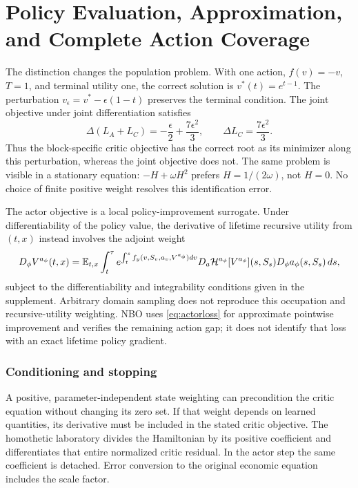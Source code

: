 \section{Policy Evaluation, Approximation, and Complete Action Coverage}\label{app:r15evaluation}
The distinction changes the population problem. With one action, $f(v)=-v$, $T=1$, and terminal utility one, the correct solution is $v^*(t)=e^{t-1}$. The perturbation $v_\epsilon=v^*-\epsilon(1-t)$ preserves the terminal condition. The joint objective under joint differentiation satisfies
\begin{equation}\label{eq:counterexample}
 \Delta(L_A+L_C)=-\frac\epsilon2+\frac{7\epsilon^2}{3},
 \qquad \Delta L_C=\frac{7\epsilon^2}{3}.
\end{equation}
Thus the block-specific critic objective has the correct root as its minimizer along this perturbation, whereas the joint objective does not. The same problem is visible in a stationary equation: $-H+\omega H^2$ prefers $H=1/(2\omega)$, not $H=0$. No choice of finite positive weight resolves this identification error.

The actor objective is a local policy-improvement surrogate. Under differentiability of the policy value, the derivative of lifetime recursive utility from $(t,x)$ instead involves the adjoint weight
\begin{equation}\label{eq:gradient}
 D_\phi V^{a_\phi}(t,x)=\mathbb E_{t,x}\int_t^\tau
 e^{\int_t^s f_y(v,S_v,a_v,V^{a_\phi})dv}
 D_a\mathcal H^{a_\phi}[V^{a_\phi}](s,S_s)D_\phi a_\phi(s,S_s)\,ds,
\end{equation}
subject to the differentiability and integrability conditions given in the supplement. Arbitrary domain sampling does not reproduce this occupation and recursive-utility weighting. NBO uses \eqref{eq:actorloss} for approximate pointwise improvement and verifies the remaining action gap; it does not identify that loss with an exact lifetime policy gradient.

\subsubsection{Conditioning and stopping}
A positive, parameter-independent state weighting can precondition the critic equation without changing its zero set. If that weight depends on learned quantities, its derivative must be included in the stated critic objective. The homothetic laboratory divides the Hamiltonian by its positive coefficient and differentiates that entire normalized critic residual. In the actor step the same coefficient is detached. Error conversion to the original economic equation includes the scale factor.

